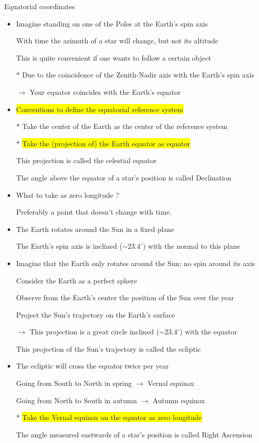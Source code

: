 \Tr
\begin{center}
{\red Equatorial coordinates}
\end{center}
%
\begin{itemize}
\item Imagine standing on one of the Poles at the Earth's spin axis
\item[] With time the azimuth of a star will change, but not its altitude
\item[] This is quite convenient if one wants to follow a certain object
\item[$\ast$] Due to the coincidence of the Zenith-Nadir axis with the Earth's spin axis
\item[] $\rightarrow$ Your equator coincides with the Earth's equator
\item \colorbox{yellow}{Conventions to define the equatorial reference system}
\item[$\ast$] {\blue Take the center of the Earth as the center of the reference system}
\item[$\ast$] \colorbox{yellow}{Take the (projection of) the Earth equator as equator}
\item[] This projection is called the {\blue celestial equator}
\item[] The {\blue angle above the equator} of a star's position is called {\blue Declination}
\item What to take as zero longitude ?
\item[] Preferably a point that doesn't change with time.
\end{itemize}

\Tr
\begin{itemize}
\item The Earth rotates around the Sun in a fixed plane
\item[] The Earth's spin axis is inclined ($\sim 23.4^{\circ}$) with the normal to this plane
\item Imagine that the Earth only rotates around the Sun; no spin around its axis
\item[] Consider the Earth as a perfect sphere
\item[] Observe from the Earth's center the position of the Sun over the year 
\item[] Project the Sun's trajectory on the Earth's surface
\item[] $\rightarrow$ This projection is a great circle inclined ($\sim 23.4^{\circ}$) with the equator
\item[] This projection of the Sun's trajectory is called the {\blue ecliptic}
\item The ecliptic will cross the equator twice per year
\item[] Going from South to North in spring $\rightarrow$ {\blue Vernal equinox}
\item[] Going from North to South in autumn $\rightarrow$ {\blue Autumn equinox}
\item[$\ast$] \colorbox{yellow}{Take the Vernal equinox on the equator as zero longitude}
\item[] The {\blue angle measured eastwards} of a star's position is called {\blue Right Ascension}
\end{itemize}


